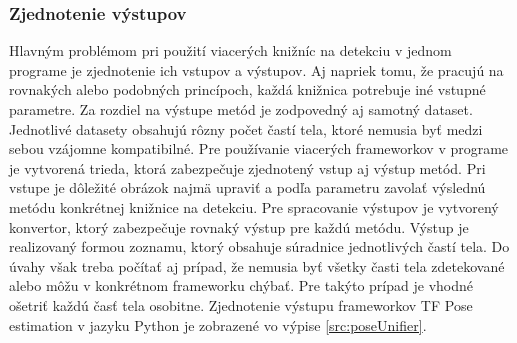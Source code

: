 \documentclass[slovak,master,dept460,male,cpp,cpdeclaration]{diploma}
\begin{document}
\subsubsection*{Zjednotenie výstupov}
	\label{sec:intersect}
Hlavným problémom pri použití viacerých knižníc na detekciu v jednom programe  je zjednotenie  ich vstupov a výstupov. Aj napriek tomu, že pracujú na rovnakých alebo podobných princípoch, každá knižnica potrebuje iné vstupné parametre. Za rozdiel na výstupe metód je zodpovedný aj samotný dataset. Jednotlivé datasety obsahujú rôzny počet častí tela, ktoré nemusia  byť medzi sebou vzájomne kompatibilné. Pre  používanie viacerých frameworkov v programe je vytvorená  trieda, ktorá  zabezpečuje zjednotený vstup aj výstup metód. Pri vstupe je dôležité obrázok najmä upraviť a podľa parametru zavolať výslednú metódu  konkrétnej knižnice na detekciu. Pre spracovanie  výstupov je  vytvorený konvertor, ktorý zabezpečuje  rovnaký výstup pre každú metódu. Výstup je realizovaný formou zoznamu, ktorý obsahuje súradnice  jednotlivých častí tela.  Do úvahy však treba počítať aj prípad, že nemusia byť všetky časti tela zdetekované alebo môžu v konkrétnom frameworku chýbať. Pre takýto prípad je vhodné ošetriť každú časť  tela osobitne. Zjednotenie výstupu frameworkov TF Pose estimation v jazyku Python je zobrazené vo výpise \ref{src:poseUnifier}.

\newpage

\end{document}
